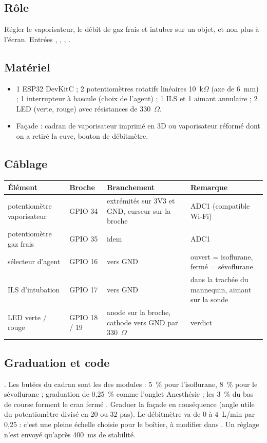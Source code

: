 \documentclass[11pt,a4paper]{article}
\begin{document}
\subsection{Rôle}
Régler le vaporisateur, le débit de gaz frais et intuber sur un objet, et non plus à l'écran. Entrées ,
, , .

\subsection{Matériel}
\begin{itemize}
  \item 1 ESP32 DevKitC ; 2 potentiomètres rotatifs linéaires 10~k\(\Omega\) (axe de 6~mm) ; 1 interrupteur à bascule
  (choix de l'agent) ; 1 ILS et 1 aimant annulaire ; 2 LED (verte, rouge) avec résistances de 330~\(\Omega\).
  \item Façade : cadran de vaporisateur imprimé en 3D ou vaporisateur réformé dont on a retiré la cuve, bouton de
  débitmètre.
\end{itemize}

\subsection{Câblage}
\begin{tabularx}{\linewidth}{llLL}
\toprule
\textbf{Élément} & \textbf{Broche} & \textbf{Branchement} & \textbf{Remarque} \\
\midrule
potentiomètre vaporisateur & GPIO 34 & extrémités sur 3V3 et GND, curseur sur la broche & ADC1 (compatible Wi-Fi) \\
potentiomètre gaz frais & GPIO 35 & idem & ADC1 \\
sélecteur d'agent & GPIO 16 & vers GND & ouvert = isoflurane, fermé = sévoflurane \\
ILS d'intubation & GPIO 17 & vers GND & dans la trachée du mannequin, aimant sur la sonde \\
LED verte / rouge & GPIO 18 / 19 & anode sur la broche, cathode vers GND par 330~\(\Omega\) & verdict \\
\bottomrule
\end{tabularx}

\subsection{Graduation et code}
. Les butées du cadran sont les  des modules :
5~\% pour l'isoflurane, 8~\% pour le sévoflurane ; graduation de 0,25~\% comme l'onglet Anesthésie ; les 3~\%
du bas de course forment le cran \og fermé \fg{}. Graduer la façade en conséquence (angle utile du potentiomètre
divisé en 20 ou 32 pas). Le débitmètre va de 0 à 4~L/min par 0,25 : c'est une pleine échelle choisie pour le boîtier,
à modifier dans . Un réglage n'est envoyé qu'après 400~ms de stabilité.
\end{document}
